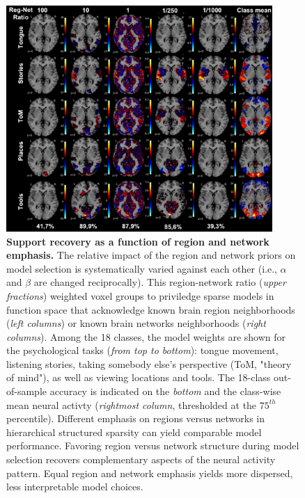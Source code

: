 \documentclass{article}
\begin{document}
\begin{figure}
\begin{centering}
\includegraphics[width=0.90\textwidth]{../figures/reg_net_ratio_colin.pdf}
\caption{\textbf{Support recovery as a function of
region and network emphasis.}
The relative impact of the region and network priors
on model selection
is systematically varied against each other
(i.e., $\alpha$ and $\beta$ are changed reciprocally).
This region-network ratio (\textit{upper fractions}) weighted voxel groups
to priviledge sparse models in function space
that acknowledge known brain region neighborhoods
(\textit{left columns}) or
known brain networks neighborhoods
(\textit{right columns}).
Among the 18 classes, the model weights are shown for the psychological
tasks (\textit{from top to bottom}): tongue movement, listening stories,
taking somebody else's perspective (ToM, "theory of mind"),
as well as
viewing locations and tools.
The 18-class out-of-sample accuracy is indicated
on the \textit{bottom} and
the class-wise mean neural activty
(\textit{rightmost column}, thresholded at the $75^{th}$ percentile).
%
Different emphasis on regions versus networks
in hierarchical structured sparsity can
yield comparable model performance.
%
Favoring region versus network structure during model selection
recovers complementary aspects of the neural activity pattern.
%
Equal region and network emphasis yields more dispersed,
less interpretable model choices.
}
\label{fig_regnetratio}
\end{centering}
\end{figure}
%
\end{document}
